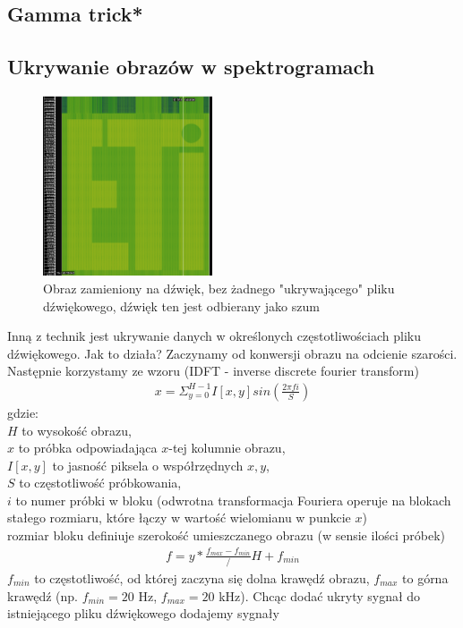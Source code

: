 \documentclass{article}
\begin{document}
\subsection{Gamma trick*}
\subsection{Ukrywanie obrazów w spektrogramach}
\begin{figure}[H]
	\centering
	\includegraphics[width=5cm]{samobraz}
	\caption{Obraz zamieniony na dźwięk, bez żadnego "ukrywającego" pliku dźwiękowego, dźwięk
	ten jest odbierany jako szum}
\end{figure}
Inną z technik jest ukrywanie danych w określonych częstotliwościach pliku dźwiękowego.
Jak to działa? Zaczynamy od konwersji obrazu na odcienie szarości.
Następnie korzystamy ze wzoru (IDFT - inverse discrete fourier transform)
\begin{gather*}
	x = \Sigma_{y=0}^{H-1}I[x,y]sin(\frac{2\pi f i}{S})
\end{gather*}
gdzie: \\ 
$H$ to wysokość obrazu, \\
$x$ to próbka odpowiadająca $x$-tej kolumnie obrazu,\\
$I[x,y]$ to jasność piksela o współrzędnych $x,y$, \\
$S$ to częstotliwość próbkowania, \\
$i$ to numer próbki w bloku (odwrotna transformacja Fouriera operuje na blokach stałego rozmiaru,
które łączy w wartość wielomianu w punkcie $x$) \\
rozmiar bloku definiuje szerokość umieszczanego obrazu (w sensie ilości próbek) 
\begin{gather*}
 f = y * \frac{f_{max} - f_{min}}/H + f_{min} 
\end{gather*}
 $f_{min}$ to częstotliwość, od której zaczyna
się dolna krawędź obrazu, $f_{max}$ to górna krawędź (np. $f_{min} = 20$ Hz, $f_{max} = 20$ kHz).
Chcąc dodać ukryty sygnał do istniejącego pliku dźwiękowego dodajemy sygnały
\end{document}
